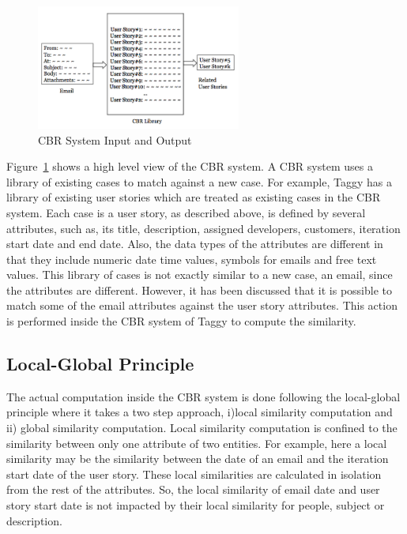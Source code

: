 \begin{figure}[!h]
	\centering
	\includegraphics[width=0.6\textwidth]{CBR.png}
    \caption{CBR System Input and Output}
	\label{fig:CBR}
\end{figure}

Figure~\ref{fig:CBR}  shows a high level view of the CBR system. A CBR system uses a library of existing cases to match against a new case. For example, Taggy has a library of existing user stories which are treated as existing cases in the CBR system. Each case is a user story, as described above, is defined by several attributes, such as, its title, description, assigned developers, customers, iteration start date and end date. Also, the data types of the attributes are different in that they include numeric date time values, symbols for emails and free text values. This library of cases is not exactly similar to a new case, an email, since the attributes are different. However, it has been discussed that it is possible to match some of the email attributes against the user story attributes. This action is performed inside the CBR system of Taggy to compute the similarity.


\subsection{Local-Global Principle}

The actual computation inside the CBR system is done following the local-global principle\cite{local_global} where it takes a two step approach, i)local similarity computation and ii) global similarity computation. Local similarity computation is confined to the similarity between only one attribute of two entities. For example, here a local similarity may be the similarity between the date of an email and the iteration start date of the user story. These local similarities are calculated in isolation from the rest of the attributes. So, the local similarity of email date and user story start date is not impacted by their local similarity for people, subject or description.

